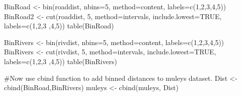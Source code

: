 \documentclass[
  letterpaper,
]{book}
\newenvironment{Shaded}{\begin{snugshade}}{\end{snugshade}}
\newcommand{\AttributeTok}[1]{\textcolor[rgb]{0.40,0.45,0.13}{#1}}
\newcommand{\CommentTok}[1]{\textcolor[rgb]{0.37,0.37,0.37}{#1}}
\newcommand{\ConstantTok}[1]{\textcolor[rgb]{0.56,0.35,0.01}{#1}}
\newcommand{\DecValTok}[1]{\textcolor[rgb]{0.68,0.00,0.00}{#1}}
\newcommand{\FunctionTok}[1]{\textcolor[rgb]{0.28,0.35,0.67}{#1}}
\newcommand{\NormalTok}[1]{\textcolor[rgb]{0.00,0.23,0.31}{#1}}
\newcommand{\OtherTok}[1]{\textcolor[rgb]{0.00,0.23,0.31}{#1}}
\newcommand{\StringTok}[1]{\textcolor[rgb]{0.13,0.47,0.30}{#1}}
\begin{document}
\begin{Shaded}
\begin{Highlighting}[]
\NormalTok{BinRoad }\OtherTok{\textless{}{-}} \FunctionTok{bin}\NormalTok{(roaddist, }\AttributeTok{nbins=}\DecValTok{5}\NormalTok{, }\AttributeTok{method=}\StringTok{\textquotesingle{}content\textquotesingle{}}\NormalTok{, }\AttributeTok{labels=}\FunctionTok{c}\NormalTok{(}\StringTok{\textquotesingle{}1\textquotesingle{}}\NormalTok{,}\StringTok{\textquotesingle{}2\textquotesingle{}}\NormalTok{,}\StringTok{\textquotesingle{}3\textquotesingle{}}\NormalTok{,}\StringTok{\textquotesingle{}4\textquotesingle{}}\NormalTok{,}\StringTok{\textquotesingle{}5\textquotesingle{}}\NormalTok{))}
\NormalTok{BinRoad2 }\OtherTok{\textless{}{-}} \FunctionTok{cut}\NormalTok{(roaddist, }\DecValTok{5}\NormalTok{, }\AttributeTok{method=}\StringTok{\textquotesingle{}intervals\textquotesingle{}}\NormalTok{, }\AttributeTok{include.lowest=}\ConstantTok{TRUE}\NormalTok{, }\AttributeTok{labels=}\FunctionTok{c}\NormalTok{(}\StringTok{\textquotesingle{}1\textquotesingle{}}\NormalTok{,}\StringTok{\textquotesingle{}2\textquotesingle{}}\NormalTok{,}\StringTok{\textquotesingle{}3\textquotesingle{}}
\NormalTok{  ,}\StringTok{\textquotesingle{}4\textquotesingle{}}\NormalTok{,}\StringTok{\textquotesingle{}5\textquotesingle{}}\NormalTok{))}
\FunctionTok{table}\NormalTok{(BinRoad)}

\NormalTok{BinRivers }\OtherTok{\textless{}{-}} \FunctionTok{bin}\NormalTok{(rivdist, }\AttributeTok{nbins=}\DecValTok{5}\NormalTok{, }\AttributeTok{method=}\StringTok{\textquotesingle{}content\textquotesingle{}}\NormalTok{, }\AttributeTok{labels=}\FunctionTok{c}\NormalTok{(}\StringTok{\textquotesingle{}1\textquotesingle{}}\NormalTok{,}\StringTok{\textquotesingle{}2\textquotesingle{}}\NormalTok{,}\StringTok{\textquotesingle{}3\textquotesingle{}}\NormalTok{,}\StringTok{\textquotesingle{}4\textquotesingle{}}\NormalTok{,}\StringTok{\textquotesingle{}5\textquotesingle{}}\NormalTok{))}
\NormalTok{BinRivers }\OtherTok{\textless{}{-}} \FunctionTok{cut}\NormalTok{(rivdist, }\DecValTok{5}\NormalTok{, }\AttributeTok{method=}\StringTok{\textquotesingle{}intervals\textquotesingle{}}\NormalTok{, }\AttributeTok{include.lowest=}\ConstantTok{TRUE}\NormalTok{, }\AttributeTok{labels=}\FunctionTok{c}\NormalTok{(}\StringTok{\textquotesingle{}1\textquotesingle{}}\NormalTok{,}\StringTok{\textquotesingle{}2\textquotesingle{}}\NormalTok{,}\StringTok{\textquotesingle{}3\textquotesingle{}}
\NormalTok{    ,}\StringTok{\textquotesingle{}4\textquotesingle{}}\NormalTok{,}\StringTok{\textquotesingle{}5\textquotesingle{}}\NormalTok{))}
\FunctionTok{table}\NormalTok{(BinRivers)}

\CommentTok{\#Now use cbind function to add binned distances to muleys dataset.}
\NormalTok{Dist }\OtherTok{\textless{}{-}} \FunctionTok{cbind}\NormalTok{(BinRoad,BinRivers)}
\NormalTok{muleys }\OtherTok{\textless{}{-}} \FunctionTok{cbind}\NormalTok{(muleys, Dist)}
\end{Highlighting}
\end{Shaded}
\end{document}
